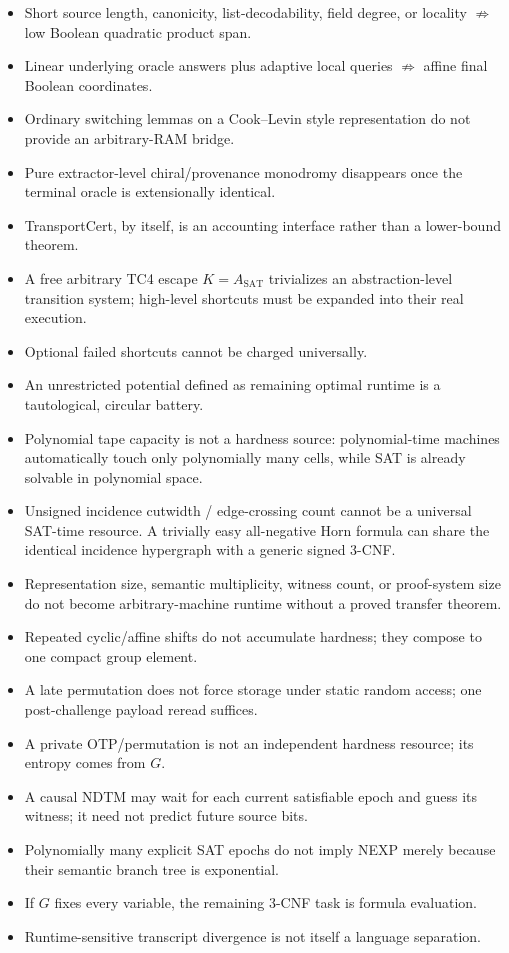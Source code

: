 \documentclass[11pt]{article}
\begin{document}
\begin{itemize}
  \item Short source length, canonicity, list-decodability, field degree, or locality
        \(\not\Rightarrow\) low Boolean quadratic product span.
  \item Linear underlying oracle answers plus adaptive local queries
        \(\not\Rightarrow\) affine final Boolean coordinates.
  \item Ordinary switching lemmas on a Cook--Levin style representation do not provide an
        arbitrary-RAM bridge.
  \item Pure extractor-level chiral/provenance monodromy disappears once the terminal oracle is
        extensionally identical.
  \item TransportCert, by itself, is an accounting interface rather than a lower-bound theorem.
  \item A free arbitrary TC4 escape \(K=A_{\mathrm{SAT}}\) trivializes an abstraction-level
        transition system; high-level shortcuts must be expanded into their real execution.
  \item Optional failed shortcuts cannot be charged universally.
  \item An unrestricted potential defined as remaining optimal runtime is a tautological,
        circular battery.
  \item Polynomial tape capacity is not a hardness source: polynomial-time machines automatically
        touch only polynomially many cells, while SAT is already solvable in polynomial space.
  \item Unsigned incidence cutwidth / edge-crossing count cannot be a universal SAT-time resource.
        A trivially easy all-negative Horn formula can share the identical incidence hypergraph with
        a generic signed 3-CNF.
  \item Representation size, semantic multiplicity, witness count, or proof-system size do not become
        arbitrary-machine runtime without a proved transfer theorem.
  \item Repeated cyclic/affine shifts do not accumulate hardness; they compose to one compact
        group element.
  \item A late permutation does not force storage under static random access; one post-challenge
        payload reread suffices.
  \item A private OTP/permutation is not an independent hardness resource; its entropy comes from \(G\).
  \item A causal NDTM may wait for each current satisfiable epoch and guess its witness; it need not
        predict future source bits.
  \item Polynomially many explicit SAT epochs do not imply NEXP merely because their semantic
        branch tree is exponential.
  \item If \(G\) fixes every variable, the remaining 3-CNF task is formula evaluation.
  \item Runtime-sensitive transcript divergence is not itself a language separation.
\end{itemize}
\end{document}
